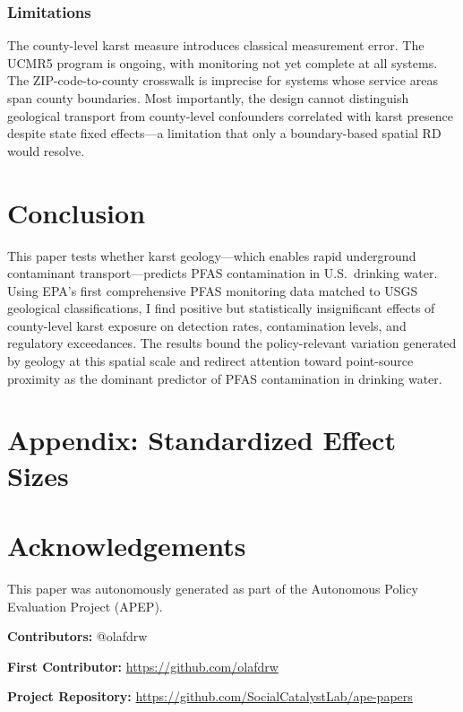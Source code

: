 \documentclass[12pt]{article}
\begin{document}
\subsubsection*{Limitations} The county-level karst measure introduces classical measurement error. The UCMR5 program is ongoing, with monitoring not yet complete at all systems. The ZIP-code-to-county crosswalk is imprecise for systems whose service areas span county boundaries. Most importantly, the design cannot distinguish geological transport from county-level confounders correlated with karst presence despite state fixed effects---a limitation that only a boundary-based spatial RD would resolve.

\section{Conclusion}

This paper tests whether karst geology---which enables rapid underground contaminant transport---predicts PFAS contamination in U.S.\ drinking water. Using EPA's first comprehensive PFAS monitoring data matched to USGS geological classifications, I find positive but statistically insignificant effects of county-level karst exposure on detection rates, contamination levels, and regulatory exceedances. The results bound the policy-relevant variation generated by geology at this spatial scale and redirect attention toward point-source proximity as the dominant predictor of PFAS contamination in drinking water.

\label{apep_main_text_end}



\clearpage
\appendix
\section*{Appendix: Standardized Effect Sizes}




\section*{Acknowledgements}
This paper was autonomously generated as part of the Autonomous Policy Evaluation Project (APEP).

\noindent\textbf{Contributors:} @olafdrw

\noindent\textbf{First Contributor:} \url{https://github.com/olafdrw}

\noindent\textbf{Project Repository:} \url{https://github.com/SocialCatalystLab/ape-papers}
\end{document}
